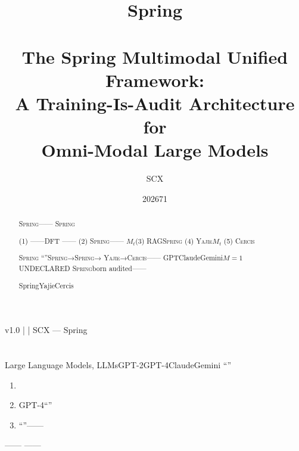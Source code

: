 \documentclass[12pt,a4paper]{article}
\title{\textbf{Spring\\[4pt]
}\\[8pt]
\large The Spring Multimodal Unified Framework:\\
A Training-Is-Audit Architecture for\\
Omni-Modal Large Models}
\author{SCX}
\date{202671}
\theoremstyle{remark}
\newcommand{\Spring}{\textsc{Spring}}
\newcommand{\Yajie}{\textsc{Yajie}}
\newcommand{\Cercis}{\textsc{Cercis}}
\begin{document}
\maketitle

\begin{center}
\footnotesize
\textbf{} v1.0 \quad | \quad
\textbf{}  \quad | \quad
\textbf{} SCX — Spring
\end{center}

\begin{abstract}
\Spring{}——
\Spring{}

(1) ——DFT
——
(2) \Spring{}——
$M_t$(3) RAG\Spring{}
(4) \Yajie{}$M_t$
(5) \Cercis{}

\Spring{}\textbf{}
“”\Spring{}→\Spring{}→
\Yajie{}→\Cercis{}——
GPTClaudeGemini$M=1$UNDECLARED
\Spring{}born audited——

\textbf{} SpringYajieCercis

\end{abstract}

\tableofcontents
\newpage

\section{}

\subsection{}

Large Language Models, LLMsGPT-2GPT-4ClaudeGemini
“”
\textbf{}




\begin{enumerate}[label=(\arabic*),itemsep=4pt]
    \item \textbf{} 
    
    
    
    \item \textbf{} GPT-4“”
    
    
    
    \item \textbf{} 
    “”——
    
\end{enumerate}

——
\textbf{}
——
\end{document}
